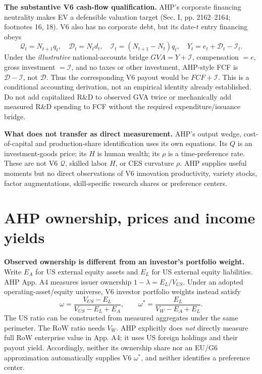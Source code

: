 \documentclass[10pt,a4paper,landscape]{article}
\begin{document}
\textbf{The substantive V6 cash-flow qualification.} AHP's corporate financing neutrality makes EV a defensible valuation target (Sec. I, pp. 2162--2164; footnotes 16, 18). V6 also has no corporate debt, but its date-$t$ entry financing obeys
\[
\mathcal Q_t=N_{t+1}q_t,\quad \mathcal D_t=N_td_t,\quad
\mathcal I_t=(N_{t+1}-N_t)q_t,\quad Y_t=e_t+\mathcal D_t-\mathcal I_t.
\]
Under the \emph{illustrative} national-accounts bridge $GVA=Y+\mathcal I$, compensation $=e$, gross investment $=\mathcal I$, and no taxes or other investment, AHP-style FCF is $\mathcal D-\mathcal I$, not $\mathcal D$. Thus the corresponding V6 payout would be $FCF+\mathcal I$. This is a conditional accounting derivation, not an empirical identity already established. Do not add capitalized R\&D to observed GVA twice or mechanically add measured R\&D spending to FCF without the required expenditure/issuance bridge.

\textbf{What does not transfer as direct measurement.} AHP's output wedge, cost-of-capital and production-share identification uses its own equations. Its $Q$ is an investment-goods price; its $H$ is human wealth; its $\rho$ is a time-preference rate. These are not V6 $\mathcal Q$, skilled labor $H$, or CES curvature $\rho$. AHP supplies useful moments but no direct observations of V6 innovation productivity, variety stocks, factor augmentations, skill-specific research shares or preference centers.

\clearpage
\section{AHP ownership, prices and income yields}
\textbf{Observed ownership is different from an investor's portfolio weight.} Write $E_A$ for US external equity assets and $E_L$ for US external equity liabilities. AHP App. A4 measures issuer ownership $1-\lambda=E_L/V_{US}$. Under an adopted operating-asset/equity universe, V6 investor portfolio weights instead satisfy
\[
\omega=\frac{V_{US}-E_L}{V_{US}-E_L+E_A},\qquad
\omega^*=\frac{E_L}{V_W-E_A+E_L}.
\]
The US ratio can be constructed from measured aggregates under the same perimeter. The RoW ratio needs $V_W$. AHP explicitly does \emph{not} directly measure full RoW enterprise value in App. A4; it uses US foreign holdings and their payout yield. Accordingly, neither its ownership share nor an EU/G6 approximation automatically supplies V6 $\omega^*$, and neither identifies a preference center.
\end{document}

